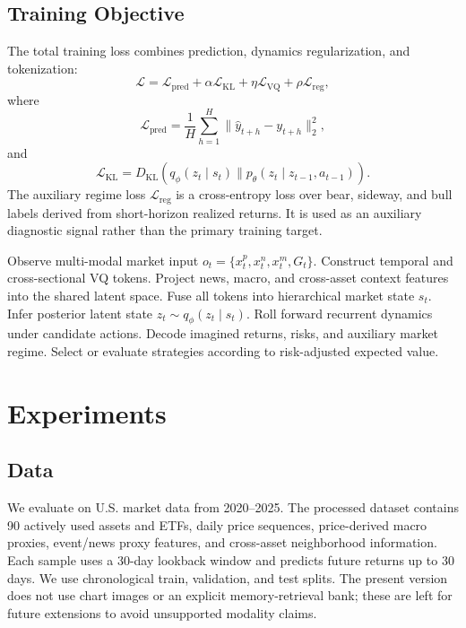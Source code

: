 \documentclass[letterpaper]{article}
\begin{document}
\subsection{Training Objective}
The total training loss combines prediction, dynamics regularization, and tokenization:
\begin{equation}
    \mathcal{L} =
    \mathcal{L}_{\mathrm{pred}}
    + \alpha \mathcal{L}_{\mathrm{KL}}
    + \eta \mathcal{L}_{\mathrm{VQ}}
    + \rho \mathcal{L}_{\mathrm{reg}},
\end{equation}
where
\begin{equation}
    \mathcal{L}_{\mathrm{pred}} =
    \frac{1}{H}\sum_{h=1}^{H}
    \|\hat{y}_{t+h} - y_{t+h}\|_2^2,
\end{equation}
and
\begin{equation}
    \mathcal{L}_{\mathrm{KL}} =
    D_{\mathrm{KL}}(q_\phi(z_t \mid s_t) \| p_\theta(z_t \mid z_{t-1}, a_{t-1})).
\end{equation}
The auxiliary regime loss $\mathcal{L}_{\mathrm{reg}}$ is a cross-entropy loss over bear, sideway, and bull labels derived from short-horizon realized returns. It is used as an auxiliary diagnostic signal rather than the primary training target.

\begin{algorithm}[t]
\caption{FinVerse World Model Learning and Strategy Evaluation}
\label{alg:finverse}
\begin{algorithmic}[1]
\STATE Observe multi-modal market input $o_t=\{x_t^p,x_t^n,x_t^m,G_t\}$.
\STATE Construct temporal and cross-sectional VQ tokens.
\STATE Project news, macro, and cross-asset context features into the shared latent space.
\STATE Fuse all tokens into hierarchical market state $s_t$.
\STATE Infer posterior latent state $z_t \sim q_\phi(z_t \mid s_t)$.
\STATE Roll forward recurrent dynamics under candidate actions.
\STATE Decode imagined returns, risks, and auxiliary market regime.
\STATE Select or evaluate strategies according to risk-adjusted expected value.
\end{algorithmic}
\end{algorithm}

\section{Experiments}
\subsection{Data}
We evaluate on U.S. market data from 2020--2025. The processed dataset contains 90 actively used assets and ETFs, daily price sequences, price-derived macro proxies, event/news proxy features, and cross-asset neighborhood information. Each sample uses a 30-day lookback window and predicts future returns up to 30 days. We use chronological train, validation, and test splits. The present version does not use chart images or an explicit memory-retrieval bank; these are left for future extensions to avoid unsupported modality claims.
\end{document}
